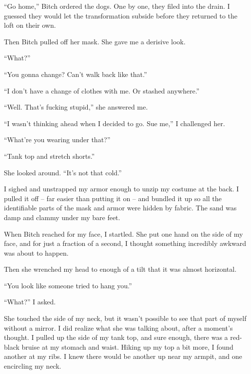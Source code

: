 ``Go home,'' Bitch ordered the dogs.  One by one, they filed into the drain.  I guessed they would let the transformation subside before they returned to the loft on their own.



Then Bitch pulled off her mask.  She gave me a derisive look.



``What?''



``You gonna change?  Can't walk back like that.''



``I don't have a change of clothes with me.  Or stashed anywhere.''



``Well.  That's fucking stupid,'' she answered me.



``I wasn't thinking ahead when I decided to go.  Sue me,'' I challenged her.



``What're you wearing under that?''



``Tank top and stretch shorts.''



She looked around.  ``It's not that cold.''



I sighed and unstrapped my armor enough to unzip my costume at the back.  I pulled it off – far easier than putting it on – and bundled it up so all the identifiable parts of the mask and armor were hidden by fabric.  The sand was damp and clammy under my bare feet.



When Bitch reached for my face, I startled.  She put one hand on the side of my face, and for just a fraction of a second, I thought something incredibly awkward was about to happen.



Then she wrenched my head to enough of a tilt that it was almost horizontal.



``You look like someone tried to hang you.''



``What?'' I asked.



She touched the side of my neck, but it wasn't possible to see that part of myself without a mirror.  I did realize what she was talking about, after a moment's thought.  I pulled up the side of my tank top, and sure enough, there was a red-black bruise at my stomach and waist.  Hiking up my top a bit more, I found another at my ribs.  I knew there would be another up near my armpit, and one encircling my neck.




